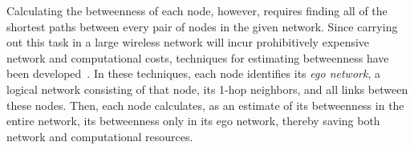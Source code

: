 
Calculating the betweenness of each node, however, requires finding all of the shortest paths between every pair of nodes in the given network.
Since carrying out this task in a large wireless network will incur prohibitively expensive network and computational costs, techniques for estimating betweenness have been developed~\cite{SIMBET,egocentric,everett,ICCN:lbcdna,Pant13:Local}.
In these techniques, each node identifies its \emph{ego network}, a logical network consisting of that node, its 1-hop neighbors, and all links between these nodes.
Then, each node calculates, as an estimate of its betweenness in the entire network, its betweenness only in its ego network, thereby saving both network and computational resources.



